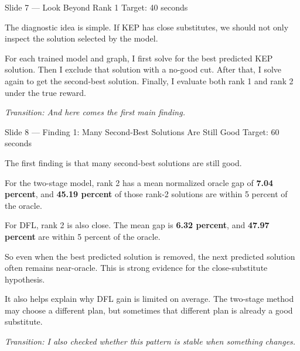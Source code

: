 \documentclass[11pt,aspectratio=169]{beamer}
\newcommand{\kw}[1]{\textcolor{navyblue}{\textbf{#1}}}
\newcommand{\tr}[1]{\vspace{0.35em}\textit{\textcolor{black!55}{Transition: #1}}}
\newcommand{\timing}[1]{\textcolor{black!45}{\scriptsize Target: #1}\par\vspace{0.25em}}
\begin{document}
\begin{frame}{Slide 7 \enspace\textmd{\small\textcolor{black!40}{--- Look Beyond Rank 1}}}
\small
\timing{40 seconds}

The diagnostic idea is simple. If KEP has close substitutes, we should not only inspect the solution selected by the model.

\vspace{0.35em}
For each trained model and graph, I first solve for the best predicted KEP solution. Then I exclude that solution with a no-good cut. After that, I solve again to get the second-best solution. Finally, I evaluate both rank 1 and rank 2 under the true reward.

\tr{And here comes the first main finding.}
\end{frame}

\begin{frame}{Slide 8 \enspace\textmd{\small\textcolor{black!40}{--- Finding 1: Many Second-Best Solutions Are Still Good}}}
\small
\timing{60 seconds}

The first finding is that many second-best solutions are still good.

\vspace{0.35em}
For the two-stage model, rank 2 has a mean normalized oracle gap of \kw{7.04 percent}, and \kw{45.19 percent} of those rank-2 solutions are within 5 percent of the oracle.

\vspace{0.35em}
For DFL, rank 2 is also close. The mean gap is \kw{6.32 percent}, and \kw{47.97 percent} are within 5 percent of the oracle.

\vspace{0.35em}
So even when the best predicted solution is removed, the next predicted solution often remains near-oracle. This is strong evidence for the close-substitute hypothesis.

\vspace{0.35em}
It also helps explain why DFL gain is limited on average. The two-stage method may choose a different plan, but sometimes that different plan is already a good substitute.

\tr{I also checked whether this pattern is stable when something changes.}
\end{frame}
\end{document}
